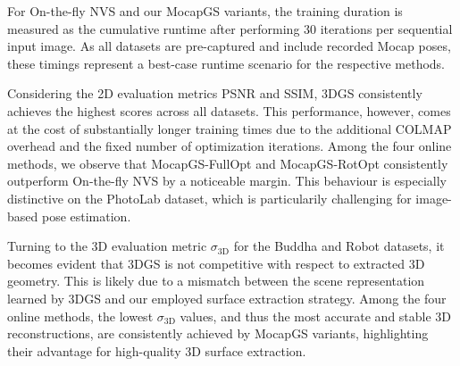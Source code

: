 \documentclass[a4paper,fleqn]{cas-dc}
\begin{document}
For On-the-fly NVS and our MocapGS variants, the training duration is measured as the cumulative runtime after performing 30 iterations per sequential input image. As all datasets are pre-captured and include recorded Mocap poses, these timings represent a best-case runtime scenario for the respective methods.

Considering the 2D evaluation metrics PSNR and SSIM, 3DGS consistently achieves the highest scores across all datasets. This performance, however, comes at the cost of substantially longer training times due to the additional COLMAP overhead and the fixed number of optimization iterations. Among the four online methods, we observe that MocapGS-FullOpt and MocapGS-RotOpt consistently outperform On-the-fly NVS by a noticeable margin. This behaviour is especially distinctive on the PhotoLab dataset, which is particularily challenging for image-based pose estimation.

Turning to the 3D evaluation metric $\sigma_{\mathrm{3D}}$ for the Buddha and Robot datasets, it becomes evident that 3DGS is not competitive with respect to extracted 3D geometry. This is likely due to a mismatch between the scene representation learned by 3DGS and our employed surface extraction strategy. Among the four online methods, the lowest $\sigma_{\mathrm{3D}}$ values, and thus the most accurate and stable 3D reconstructions, are consistently achieved by MocapGS variants, highlighting their advantage for high-quality 3D surface extraction.
\end{document}
